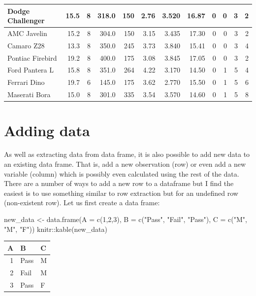 \documentclass[
]{book}
\newenvironment{Shaded}{\begin{snugshade}}{\end{snugshade}}
\newcommand{\AttributeTok}[1]{\textcolor[rgb]{0.77,0.63,0.00}{#1}}
\newcommand{\DecValTok}[1]{\textcolor[rgb]{0.00,0.00,0.81}{#1}}
\newcommand{\FunctionTok}[1]{\textcolor[rgb]{0.00,0.00,0.00}{#1}}
\newcommand{\NormalTok}[1]{#1}
\newcommand{\OtherTok}[1]{\textcolor[rgb]{0.56,0.35,0.01}{#1}}
\newcommand{\SpecialCharTok}[1]{\textcolor[rgb]{0.00,0.00,0.00}{#1}}
\newcommand{\StringTok}[1]{\textcolor[rgb]{0.31,0.60,0.02}{#1}}
\theoremstyle{definition}
\theoremstyle{definition}
\theoremstyle{definition}
\theoremstyle{definition}
\theoremstyle{remark}
\begin{document}
\begin{tabular}{l|r|r|r|r|r|r|r|r|r|r|r}
Dodge Challenger & 15.5 & 8 & 318.0 & 150 & 2.76 & 3.520 & 16.87 & 0 & 0 & 3 & 2\\
\hline
AMC Javelin & 15.2 & 8 & 304.0 & 150 & 3.15 & 3.435 & 17.30 & 0 & 0 & 3 & 2\\
\hline
Camaro Z28 & 13.3 & 8 & 350.0 & 245 & 3.73 & 3.840 & 15.41 & 0 & 0 & 3 & 4\\
\hline
Pontiac Firebird & 19.2 & 8 & 400.0 & 175 & 3.08 & 3.845 & 17.05 & 0 & 0 & 3 & 2\\
\hline
Ford Pantera L & 15.8 & 8 & 351.0 & 264 & 4.22 & 3.170 & 14.50 & 0 & 1 & 5 & 4\\
\hline
Ferrari Dino & 19.7 & 6 & 145.0 & 175 & 3.62 & 2.770 & 15.50 & 0 & 1 & 5 & 6\\
\hline
Maserati Bora & 15.0 & 8 & 301.0 & 335 & 3.54 & 3.570 & 14.60 & 0 & 1 & 5 & 8\\
\hline
\end{tabular}

\hypertarget{adding-data}{%
\section{Adding data}\label{adding-data}}

As well as extracting data from data frame, it is also possible to add new data to an existing data frame. That is, add a new observation (row) or even add a new variable (column) which is possibly even calculated using the rest of the data. There are a number of ways to add a new row to a dataframe but I find the easiest is to use something similar to row extraction but for an undefined row (non-existent row). Let us first create a data frame:

\begin{Shaded}
\begin{Highlighting}[]
\NormalTok{new\_data }\OtherTok{\textless{}{-}} \FunctionTok{data.frame}\NormalTok{(}\AttributeTok{A =} \FunctionTok{c}\NormalTok{(}\DecValTok{1}\NormalTok{,}\DecValTok{2}\NormalTok{,}\DecValTok{3}\NormalTok{), }\AttributeTok{B =} \FunctionTok{c}\NormalTok{(}\StringTok{"Pass"}\NormalTok{, }\StringTok{"Fail"}\NormalTok{, }\StringTok{"Pass"}\NormalTok{), }\AttributeTok{C =} \FunctionTok{c}\NormalTok{(}\StringTok{"M"}\NormalTok{, }\StringTok{"M"}\NormalTok{, }\StringTok{"F"}\NormalTok{))}
\NormalTok{knitr}\SpecialCharTok{::}\FunctionTok{kable}\NormalTok{(new\_data)}
\end{Highlighting}
\end{Shaded}

\begin{tabular}{r|l|l}
\hline
A & B & C\\
\hline
1 & Pass & M\\
\hline
2 & Fail & M\\
\hline
3 & Pass & F\\
\hline
\end{tabular}
\end{document}
